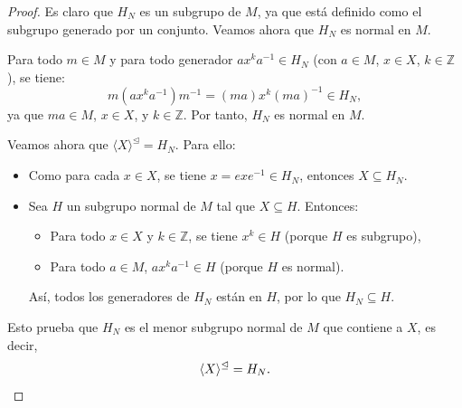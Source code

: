 \vspace{0.4cm}

\begin{observacion}
\end{observacion}

\vspace{0.4cm}

\begin{proposicion}
\end{proposicion}


\begin{proof}
	Es claro que \( H_N \) es un subgrupo de \( M \), ya que está definido como el subgrupo generado por un conjunto. Veamos ahora que \( H_N \) es normal en \( M \).
	
	\medskip
	\noindent Para todo \( m \in M \) y para todo generador \( a x^k a^{-1} \in H_N \) (con \( a \in M \), \( x \in X \), \( k \in \mathbb{Z} \)), se tiene:
	\[
	m (a x^k a^{-1}) m^{-1} = (m a) x^k (m a)^{-1} \in H_N,
	\]
	ya que \( m a \in M \), \( x \in X \), y \( k \in \mathbb{Z} \). Por tanto, \( H_N \) es normal en \( M \).
	
	\medskip
	\noindent Veamos ahora que \( \langle X \rangle^{\trianglelefteq} = H_N \). Para ello:
	\begin{itemize}
		\item Como para cada \( x \in X \), se tiene \( x = e x e^{-1} \in H_N \), entonces \( X \subseteq H_N \).
		\item Sea \( H \) un subgrupo normal de \( M \) tal que \( X \subseteq H \). Entonces:
		\begin{itemize}
			\item Para todo \( x \in X \) y \( k \in \mathbb{Z} \), se tiene \( x^k \in H \) (porque \( H \) es subgrupo),
			\item Para todo \( a \in M \), \( a x^k a^{-1} \in H \) (porque \( H \) es normal).
		\end{itemize}
		Así, todos los generadores de \( H_N \) están en \( H \), por lo que \( H_N \subseteq H \).
	\end{itemize}
	Esto prueba que \( H_N \) es el menor subgrupo normal de \( M \) que contiene a \( X \), es decir,
	\[
	\langle X \rangle^{\trianglelefteq} = H_N. \qedhere
	\]
\end{proof}



